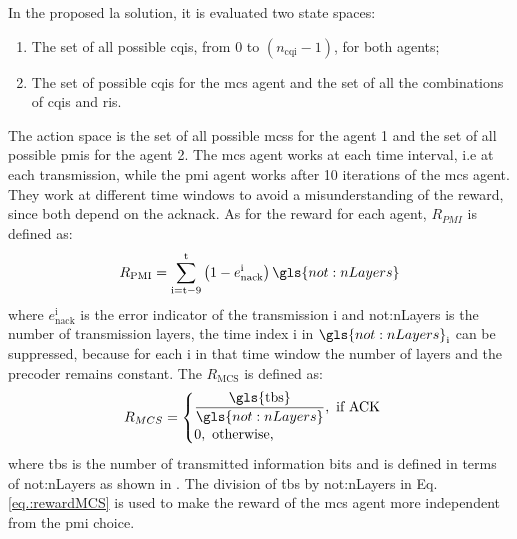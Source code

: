 In the proposed \gls{la} solution, it is evaluated two state spaces:
\begin{enumerate}
    \item The set of all possible \gls{cqi}s, from $0$ to $(n_{\text{cqi}}-1)$, for both agents;
    \item The set of possible \glspl{cqi} for the \gls{mcs} agent and the set of all the combinations of \glspl{cqi} and \glspl{ri}.
\end{enumerate}
%
The action space is the set of all possible \gls{mcs}s for the agent 1 and the set of all possible \gls{pmi}s for the agent 2.
%
The \gls{mcs} agent works at each time interval, i.e at each transmission, while the \gls{pmi} agent works after 10 iterations of the \gls{mcs} agent.
%
They work at different time windows to avoid a misunderstanding of the reward, since both depend on the \gls{acknack}.
%
As for the reward for each agent, $R_{PMI}$ is defined as:
%
\begin{equation}\label{eq.:rewardPMI}
R_{\text{PMI}} = \sum_{\textrm{i}=\textrm{t}-9}^\textrm{t} \left( 1- e_{\text{nack}}^\textrm{i} \right) \gls{not:nLayers}
\end{equation}
%
\noindent where $e_{\text{nack}}^\textrm{i}$ is the error indicator of the transmission $\textrm{i}$ and \gls{not:nLayers} is the number of transmission layers, the time index $\textrm{i}$ in $\gls{not:nLayers}_\textrm{i}$ can be suppressed, because for each $\textrm{i}$ in that time window the number of layers and the precoder remains constant.
%
The $R_{\text{MCS}}$ is defined as:
\begin{equation}\label{eq.:rewardMCS}
R_{MCS} = \begin{cases}
\dfrac{\textrm{\gls{tbs}}}{\gls{not:nLayers}}, \text{ if ACK} \\
0, \text{ otherwise,}
\end{cases}
\end{equation}
\noindent where \gls{tbs} is the number of transmitted information bits and is defined in terms of \gls{not:nLayers} as shown in \cite{3gpp.38.214}.
%
The division of \gls{tbs} by \gls{not:nLayers} in Eq. \eqref{eq.:rewardMCS} is used to make the reward of the \gls{mcs} agent more independent from the \gls{pmi} choice.
%




